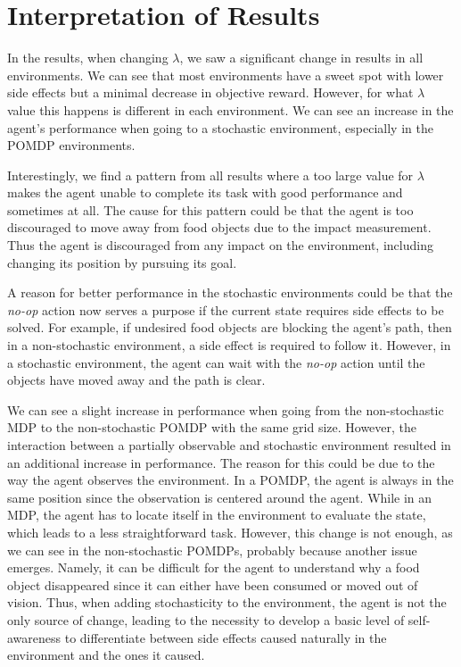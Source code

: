 \documentclass[12pt,A4]{report}
\theoremstyle{definition}
\begin{document}
\section{Interpretation of Results}
In the results, when changing $\lambda$, we saw a significant change in results in all environments. We can see that most environments have a sweet spot with lower side effects but a minimal decrease in objective reward. However, for what $\lambda$ value this happens is different in each environment. We can see an increase in the agent's performance when going to a stochastic environment, especially in the POMDP environments. 

Interestingly, we find a pattern from all results where a too large value for $\lambda$ makes the agent unable to complete its task with good performance and sometimes at all. The cause for this pattern could be that the agent is too discouraged to move away from food objects due to the impact measurement. Thus the agent is discouraged from any impact on the environment, including changing its position by pursuing its goal. 

A reason for better performance in the stochastic environments could be that the \textit{no-op} action now serves a purpose if the current state requires side effects to be solved. For example, if undesired food objects are blocking the agent's path, then in a non-stochastic environment, a side effect is required to follow it. However, in a stochastic environment, the agent can wait with the \textit{no-op} action until the objects have moved away and the path is clear.

We can see a slight increase in performance when going from the non-stochastic MDP to the non-stochastic POMDP with the same grid size. However, the interaction between a partially observable and stochastic environment resulted in an additional increase in performance. The reason for this could be due to the way the agent observes the environment. In a POMDP, the agent is always in the same position since the observation is centered around the agent. While in an MDP, the agent has to locate itself in the environment to evaluate the state, which leads to a less straightforward task. However, this change is not enough, as we can see in the non-stochastic POMDPs, probably because another issue emerges. Namely, it can be difficult for the agent to understand why a food object disappeared since it can either have been consumed or moved out of vision. Thus, when adding stochasticity to the environment, the agent is not the only source of change, leading to the necessity to develop a basic level of self-awareness to differentiate between side effects caused naturally in the environment and the ones it caused.
\end{document}

